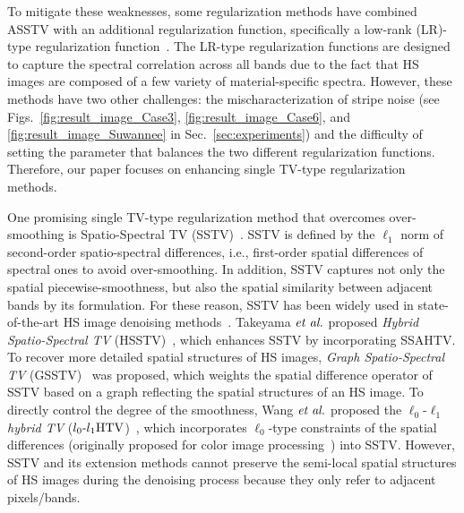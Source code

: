 \documentclass[10pt,journal]{IEEEtran}
\begin{document}
To mitigate these weaknesses, some regularization methods have combined ASSTV with an additional regularization function, specifically a low-rank (LR)-type regularization function~\cite{He2016LRTV, Wang2018LRTDTV, Chen2023TPTV}.
The LR-type regularization functions are designed to capture the spectral correlation across all bands due to the fact that HS images are composed of a few variety of material-specific spectra.
However, these methods have two other challenges: the mischaracterization of stripe noise (see Figs.~\ref{fig:result_image_Case3}, \ref{fig:result_image_Case6}, and \ref{fig:result_image_Suwannee} in Sec.~\ref{sec:experiments}) and the difficulty of setting the parameter that balances the two different regularization functions.
Therefore, our paper focuses on enhancing single TV-type regularization methods.


One promising single TV-type regularization method that overcomes over-smoothing is Spatio-Spectral TV (SSTV)~\cite{Aggarwal2016SSTV}.
SSTV is defined by the $\ell_{1}$ norm of second-order spatio-spectral differences, i.e., first-order spatial differences of spectral ones to avoid over-smoothing.
In addition, SSTV captures not only the spatial piecewise-smoothness, but also the spatial similarity between adjacent bands by its formulation.
For these reason, SSTV has been widely used in state-of-the-art HS image denoising methods~\cite{Fan2018SSTV-LRTF,Ince2019GLSSTV,Takeyama2020HSSTV,Wang2021l0l1HTV,Takemoto2022GSSTV}.
Takeyama $\textit{et al.}$ proposed \textit{Hybrid Spatio-Spectral TV} (HSSTV)~\cite{Takeyama2020HSSTV}, which enhances SSTV by incorporating SSAHTV.
To recover more detailed spatial structures of HS images, \textit{Graph Spatio-Spectral TV} (GSSTV)~\cite{Takemoto2022GSSTV} was proposed, which weights the spatial difference operator of SSTV based on a graph reflecting the spatial structures of an HS image.
To directly control the degree of the smoothness, Wang $\textit{et al.}$ proposed the $\ell_{0}\text{-}\ell_{1}$ \textit{hybrid TV} (${l_{0}\text{-}l_{1}\text{HTV}}$)~\cite{Wang2021l0l1HTV}, which incorporates $\ell_{0}$-type constraints of the spatial differences (originally proposed for color image processing~\cite{Ono2017l0Gradient}) into SSTV.
However, SSTV and its extension methods cannot preserve the semi-local spatial structures of HS images during the denoising process because they only refer to adjacent pixels/bands.
\end{document}
